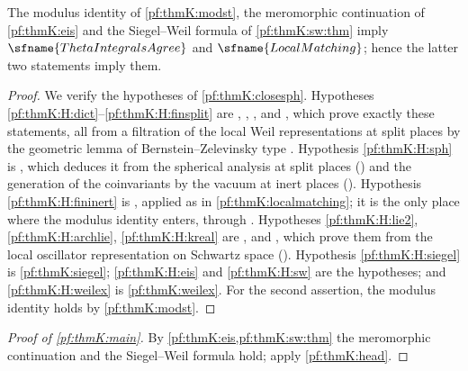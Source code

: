 \begin{theorem}\label{pf:thmK:head}
The modulus identity of \cref{pf:thmK:modst}, the meromorphic continuation of \cref{pf:thmK:eis} and the Siegel--Weil formula
of \cref{pf:thmK:sw:thm} imply $\sfname{ThetaIntegralsAgree}$ and $\sfname{LocalMatching}$; hence the latter two statements
imply them.
\end{theorem}

\begin{proof}
We verify the hypotheses of \cref{pf:thmK:closesph}. Hypotheses \ref{pf:thmK:H:dict}--\ref{pf:thmK:H:finsplit} are
,
,
,
 and
, which prove exactly these statements, all from a filtration
of the local Weil representations at split places by the geometric lemma of Bernstein--Zelevinsky type
\cite{BernsteinZelevinsky1977}. Hypothesis \ref{pf:thmK:H:sph} is , which deduces it
from the spherical analysis at split places () and the generation of the
coinvariants by the vacuum at inert places (). Hypothesis \ref{pf:thmK:H:fininert} is
, applied as in \cref{pf:thmK:localmatching}; it is the only place where the modulus
identity enters, through . Hypotheses \ref{pf:thmK:H:lie2},
\ref{pf:thmK:H:archlie}, \ref{pf:thmK:H:kreal} are ,
 and , which prove them from the local
oscillator representation on Schwartz space (). Hypothesis
\ref{pf:thmK:H:siegel} is \cref{pf:thmK:siegel}; \ref{pf:thmK:H:eis} and \ref{pf:thmK:H:sw} are the hypotheses; and
\ref{pf:thmK:H:weilex} is \cref{pf:thmK:weilex}. For the second assertion, the modulus identity holds by
\cref{pf:thmK:modst}.
\end{proof}

\begin{proof}[Proof of \cref{pf:thmK:main}]
By \cref{pf:thmK:eis,pf:thmK:sw:thm} the meromorphic continuation and the Siegel--Weil formula hold; apply
\cref{pf:thmK:head}.
\end{proof}

